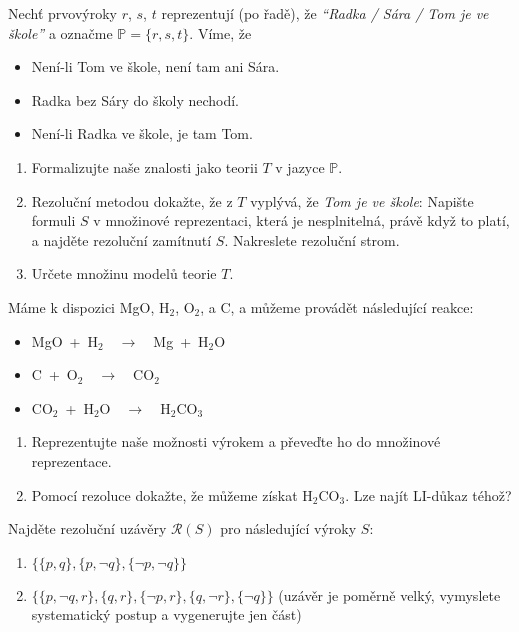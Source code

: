 \documentclass[a4paper,12pt]{article}
\begin{document}
    
    \medskip\begin{problem}Nechť prvovýroky $r$, $s$, $t$  reprezentují (po řadě), že \emph{``Radka / Sára / Tom je ve škole''} a označme $\mathbb{P}=\{r,s,t\}$. Víme, že
        \begin{itemize}\it
        \item Není-li Tom ve škole, není tam ani Sára.
        \item Radka bez Sáry do školy nechodí.
        \item Není-li Radka ve škole, je tam Tom.
        \end{itemize}
        \begin{enumerate}
        \item Formalizujte naše znalosti jako teorii $T$ v jazyce $\mathbb P$.
        \item Rezoluční metodou dokažte, že z $T$ vyplývá, že \emph{Tom je ve škole}: Napište formuli $S$ v množinové reprezentaci, která je nesplnitelná, právě když to platí, a najděte rezoluční zamítnutí $S$. Nakreslete rezoluční strom.
        \item Určete množinu modelů teorie $T$.
        \end{enumerate}
    \end{problem}
    
    
    \medskip\begin{problem} Máme k dispozici MgO, H$_2$, O$_2$, a C, a můžeme provádět následující reakce:
        \begin{itemize}
            \item MgO\ +\ H$_2$\ \ $\to$\ \ Mg\ +\ H$_2$O
            \item C\ +\ O$_2$\ \ $\to$\ \ CO$_2$
            \item CO$_2$\ +\ H$_2$O\ \ $\to$\ \ H$_2$CO$_3$
        \end{itemize}
        \begin{enumerate}
            \item Reprezentujte naše možnosti výrokem %
            a převeďte ho do množinové reprezentace.
            \item Pomocí rezoluce dokažte, že můžeme získat H$_2$CO$_3$. Lze najít LI-důkaz téhož?
        \end{enumerate}
    \end{problem}
    
    
    \medskip\begin{problem}
        Najděte rezoluční uzávěry $\mathcal{R}(S)$ pro následující výroky $S$:
        \begin{enumerate}
            \item $\{\{p,q\},\{p,\neg q\},\{\neg p,\neg q\}\}$
            \item $\{\{p,\neg q,r\},\{q,r\},\{\neg p, r\},\{q,\neg r\},\{\neg q\}\}$ (uzávěr je poměrně velký, vymyslete systematický postup a vygenerujte jen část)
        \end{enumerate}
    \end{problem}
        
\end{document}
